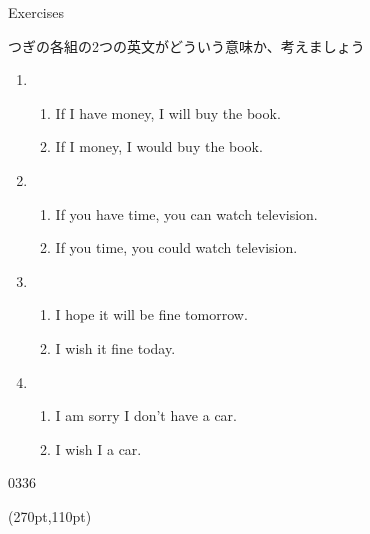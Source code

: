 \documentclass[aspectratio=169,xcolor={dvipsnames,table}]{beamer}
\begin{document}
\begin{frame}[plain,t]{Exercises}

{\small つぎの各組の2つの英文がどういう意味か、考えましょう}

\begin{enumerate}
 \item \begin{enumerate}
	\item If I have money, I will buy the book. 
	\item If I  money, I would buy the book.
       \end{enumerate}
 \item \begin{enumerate}
	\item If you have time, you can watch television.
	\item If you  time, you could watch television.
       \end{enumerate}
 \item \begin{enumerate}
	\item I hope it will be fine tomorrow.
	\item I wish it  fine today.
       \end{enumerate}
 \item \begin{enumerate}
	\item I am sorry I don't have a car.
	\item I wish I  a car.
       \end{enumerate}
\end{enumerate}

\vspace{50pt}

\hfill{\tiny 0336}\,{{\scriptsize {}}}
\begin{textblock*}{0.4\linewidth}(270pt,110pt)
\end{textblock*}


\end{frame}
\end{document}
